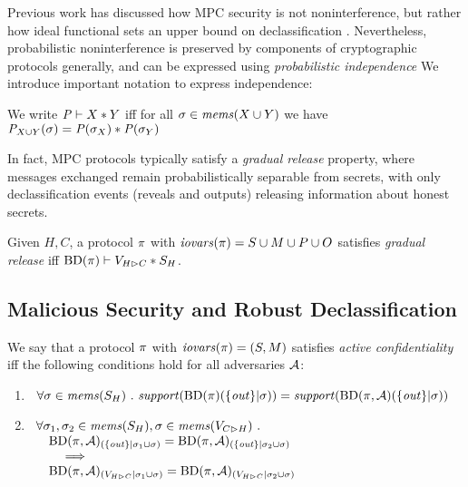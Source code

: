 Previous work has discussed how MPC security is not noninterference,
but rather how ideal functional sets an upper bound on
declassification \cite{6266151,almeida2018enforcing}. Nevertheless,
probabilistic noninterference is preserved by components of
cryptographic protocols generally, and can be expressed using
\emph{probabilistic independence} \cite{darais2019language,barthe2019probabilistic}
We introduce important notation to express independence:
\begin{definition}
  We write $\mathit{P} \vdash X * Y$ iff for all
    $\sigma \in \mathit{mems}(X \cup Y)$ we have
  ${\mathit{P}}_{X \cup Y}(\sigma) =
  \mathit{P}(\sigma_X) * \mathit{P}(\sigma_Y)$
\end{definition}

In fact, MPC protocols typically satisfy a \emph{gradual release}
property\cite{XXX}, where messages exchanged remain probabilistically separable
from secrets, with only declassification events (reveals and outputs)
releasing information about honest secrets. 
\begin{definition}
  Given $H,C$, a protocol $\pi$ with $\mathit{iovars}(\pi) = S \cup M \cup P \cup O$
  satisfies \emph{gradual release} iff
  $\mathrm{BD}(\pi) \vdash V_{H \rhd C} * S_H$.
\end{definition}

\subsection{Malicious Security and Robust Declassification}

\begin{definition}
  We say that a protocol $\pi$ with $\mathit{iovars}(\pi) = (S,M)$ satisfies \emph{active confidentiality} iff the following conditions hold
  for all adversaries $\mathcal{A}$:
  \begin{enumerate}
  \item $\ \,\forall \store \in \mems(S_H) \ .\ \support(\progtt(\prog)(\{ \outv \}|\store)) =
    \support(\progtt(\prog,\adversary)(\{ \outv \}|\store))$
  \item $\begin{array}[t]{l}\forall \sigma_1, \sigma_2 \in \mathit{mems}(S_H), \sigma \in \mathit{mems}(V_{C \rhd H})\ . \\
    \quad
    \mathrm{BD}(\pi,\mathcal{A})_{({\{ \mathit{out} \}}|{\sigma_1 \cup \sigma})} =
    \mathrm{BD}(\pi,\mathcal{A})_{({\{ \mathit{out} \}}|{\sigma_2 \cup \sigma})} \\
    \qquad \implies\\
    \quad
    \mathrm{BD}(\pi,\mathcal{A})_{({V_{H \rhd C}}|{\sigma_1 \cup \sigma})} =
    \mathrm{BD}(\pi,\mathcal{A})_{({V_{H \rhd C}}|{\sigma_2 \cup \sigma})}\end{array}$
  \end{enumerate}
\end{definition}

